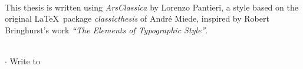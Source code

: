 
\clearpage
{}
\thispagestyle{empty}

\hfill

\vfill


\noindent{}\rmfamily\\
This thesis is written using \textit{ArsClassica} by Lorenzo Pantieri, a style
based on the original \LaTeX~package \textit{classicthesis} of André Miede,
inspired by Robert Bringhurst’s work \textit{“The Elements of Typographic
Style”}.
\newline


\noindent{}\rmfamily\\
\leftpointright	 \href{mailto:\myEmail}{\myEmail}
$\cdot$ Write to \myName
